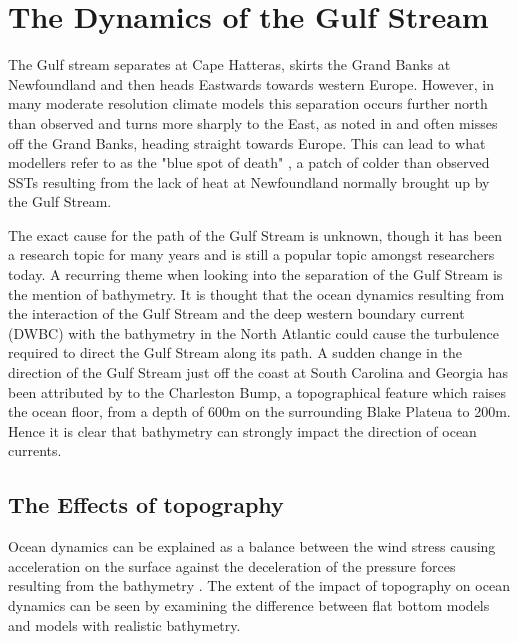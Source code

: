 \documentclass[..\EOYR.tex]{subfiles}
\begin{document}
\section{The Dynamics of the Gulf Stream}
\label{SEC:DynamicsGulfStream}

The Gulf stream separates at Cape Hatteras, skirts the Grand Banks at Newfoundland and then heads Eastwards towards western Europe. However, in many moderate resolution climate models this separation occurs further north than observed and turns more sharply to the East, as noted in \citep{Hurlburt2008} and often misses off the Grand Banks, heading straight towards Europe. This can lead to what modellers refer to as the "blue spot of death" \citep{Gnanadesikan2007}, a patch of colder than observed SSTs resulting from the lack of heat at Newfoundland normally brought up by the Gulf Stream.

The exact cause for the path of the Gulf Stream is unknown, though it has been a research topic for many years and is still a popular topic amongst researchers today. A recurring theme when looking into the separation of the Gulf Stream is the mention of bathymetry. It is thought \citep{Gula2014}\citep{NaveiraGarabato2013}\citep{Nikurashin2012a} that the ocean dynamics resulting from the interaction of the Gulf Stream and the deep western boundary current (DWBC) with the bathymetry in the North Atlantic could cause the turbulence required to direct the Gulf Stream along its path. A sudden change in the direction of the Gulf Stream just off the coast at South Carolina and Georgia has been attributed by \citep{Gula2014} to the Charleston Bump, a topographical feature which raises the ocean floor, from a depth of 600m on the surrounding Blake Plateua to 200m. Hence it is clear that bathymetry can strongly impact the direction of ocean currents.



\subsection{The Effects of topography}
\label{SSEC:EffectsOfTopography}

Ocean dynamics can be explained as a balance between the wind stress causing acceleration on the surface against the deceleration of the pressure forces resulting from the bathymetry \citep{NaveiraGarabato2013}.
The extent of the impact of topography on ocean dynamics can be seen by examining the difference between flat bottom models and models with realistic bathymetry.
\end{document}
